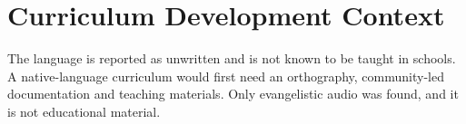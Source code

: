 \documentclass[12pt]{article}
\begin{document}
\section{Curriculum Development Context}
The language is reported as unwritten and is not known to be taught in schools. A native-language curriculum would first need an orthography, community-led documentation and teaching materials. Only evangelistic audio was found, and it is not educational material.
\end{document}
